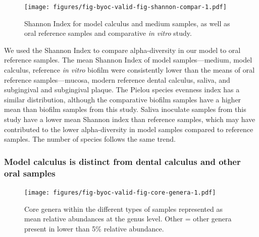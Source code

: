 \documentclass[
  letterpaper,
]{book}
\begin{document}
\begin{figure}

{\centering \texttt{[image: figures/fig-byoc-valid-fig-shannon-compar-1.pdf]}

}

\caption{\label{fig-shannon-compar}Shannon Index for model calculus and
medium samples, as well as oral reference samples and comparative
\emph{in vitro} study.}

\end{figure}

We used the Shannon Index to compare alpha-diversity in our model to
oral reference samples. The mean Shannon Index of model
samples---medium, model calculus, reference \emph{in vitro} biofilm were
consistently lower than the means of oral reference samples---mucosa,
modern reference dental calculus, saliva, and subgingival and
subgingival plaque. The Pielou species evenness index has a similar
distribution, although the comparative biofilm samples have a higher
mean than biofilm samples from this study. Saliva inoculate samples from
this study have a lower mean Shannon index than reference samples, which
may have contributed to the lower alpha-diversity in model samples
compared to reference samples. The number of species follows the same
trend.

\hypertarget{model-calculus-is-distinct-from-dental-calculus-and-other-oral-samples}{%
\subsubsection{Model calculus is distinct from dental calculus and other
oral
samples}\label{model-calculus-is-distinct-from-dental-calculus-and-other-oral-samples}}

\begin{figure}

{\centering \texttt{[image: figures/fig-byoc-valid-fig-core-genera-1.pdf]}

}

\caption{\label{fig-core-genera}Core genera within the different types
of samples represented as mean relative abundances at the genus level.
Other = other genera present in lower than 5\% relative abundance.}

\end{figure}
\end{document}
